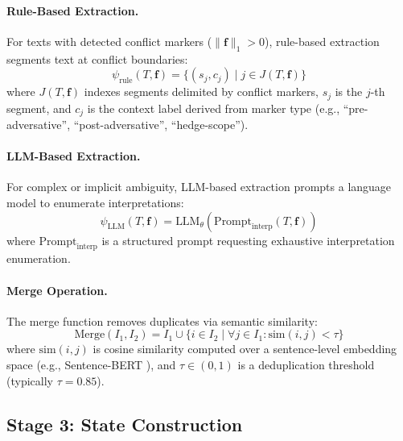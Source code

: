 \documentclass[11pt,a4paper]{article}
\begin{document}
\paragraph{Rule-Based Extraction.}
For texts with detected conflict markers ($\|\mathbf{f}\|_1 > 0$), 
rule-based extraction segments text at conflict boundaries:
\begin{equation}
\psi_{\text{rule}}(T, \mathbf{f}) = \{(s_j, c_j) \mid j \in J(T, \mathbf{f})\}
\end{equation}
where $J(T, \mathbf{f})$ indexes segments delimited by conflict markers, 
$s_j$ is the $j$-th segment, and $c_j$ is the context label derived from 
marker type (e.g., ``pre-adversative'', ``post-adversative'', ``hedge-scope'').

\paragraph{LLM-Based Extraction.}
For complex or implicit ambiguity, LLM-based extraction prompts a language 
model to enumerate interpretations:
\begin{equation}
\psi_{\text{LLM}}(T, \mathbf{f}) = \text{LLM}_{\theta}(\text{Prompt}_{\text{interp}}(T, \mathbf{f}))
\end{equation}
where $\text{Prompt}_{\text{interp}}$ is a structured prompt requesting 
exhaustive interpretation enumeration.

\paragraph{Merge Operation.}
The merge function removes duplicates via semantic similarity:
\begin{equation}
\text{Merge}(I_1, I_2) = I_1 \cup \{i \in I_2 \mid \forall j \in I_1: \text{sim}(i,j) < \tau\}
\end{equation}
where $\text{sim}(i, j)$ is cosine similarity computed over a sentence-level 
embedding space (e.g., Sentence-BERT \cite{reimers2019sentencebert}), 
and $\tau \in (0,1)$ is a deduplication threshold (typically $\tau = 0.85$).

\subsection{Stage 3: State Construction}
\end{document}
